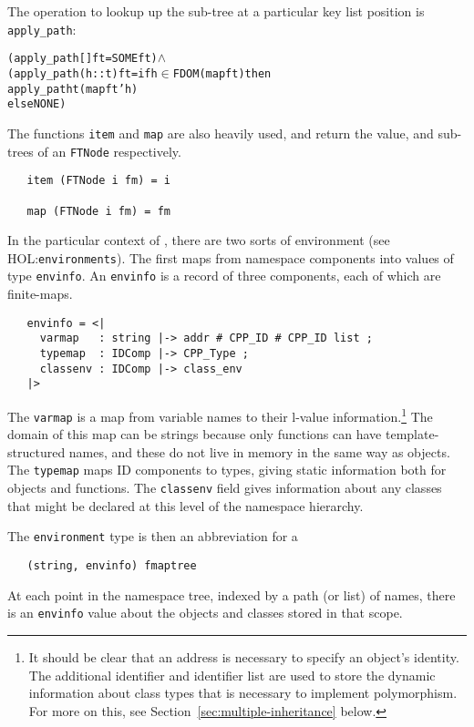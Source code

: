 \documentclass[11pt]{article}
\newcommand{\HOLfile}[1]{HOL:\texttt{#1}}
\begin{document}
The operation to lookup up the sub-tree at a particular key list position
is \texttt{apply_path}:
\begin{alltt}
  (apply_path [] ft = SOME ft) \(\land\)
  (apply_path (h::t) ft = if h \(\in\) FDOM (map ft) then
                             apply_path t (map ft ' h)
                          else NONE)

\end{alltt}

The functions \texttt{item} and \texttt{map} are also heavily used,
and return the value, and sub-trees of an \texttt{FTNode}
respectively.
\begin{verbatim}
   item (FTNode i fm) = i

   map (FTNode i fm) = fm
\end{verbatim}

In the particular context of \cpp{}, there are two sorts of
environment (see \HOLfile{environments}).  The first maps from
namespace components into values of type \texttt{envinfo}.  An
\texttt{envinfo} is a record of three components, each of which are
finite-maps.
\begin{verbatim}
   envinfo = <|
     varmap   : string |-> addr # CPP_ID # CPP_ID list ;
     typemap  : IDComp |-> CPP_Type ;
     classenv : IDComp |-> class_env
   |>
\end{verbatim}
The \texttt{varmap} is a map from variable names to their l-value
information.\footnote{It should be clear that an address is necessary
  to specify an object's identity.  The additional identifier and
  identifier list are used to store the dynamic information about
  class types that is necessary to implement polymorphism.  For more
  on this, see Section~\ref{sec:multiple-inheritance} below.}  The
domain of this map can be strings because only functions can have
template-structured names, and these do not live in memory in the same
way as objects.  The \texttt{typemap} maps ID components to types,
giving static information both for objects and functions.  The
\texttt{classenv} field gives information about any classes that might
be declared at this level of the namespace hierarchy.

The \texttt{environment} type is then an abbreviation for a
\begin{verbatim}
   (string, envinfo) fmaptree
\end{verbatim}
At each point in the namespace tree, indexed by a path (or list) of
names, there is an \texttt{envinfo} value about the objects and
classes stored in that scope.
\end{document}
